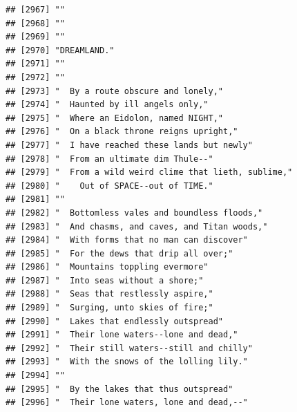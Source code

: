 \documentclass{article}\usepackage[]{graphicx}\usepackage[]{color}
\makeatletter
\newenvironment{kframe}{%
 \def\at@end@of@kframe{}%
 \ifinner\ifhmode%
  \def\at@end@of@kframe{\end{minipage}}%
  \begin{minipage}{\columnwidth}%
 \fi\fi%
 \def\FrameCommand##1{\hskip\@totalleftmargin \hskip-\fboxsep
 \colorbox{shadecolor}{##1}\hskip-\fboxsep
     \hskip-\linewidth \hskip-\@totalleftmargin \hskip\columnwidth}%
 \MakeFramed {\advance\hsize-\width
   \@totalleftmargin\z@ \linewidth\hsize
   \@setminipage}}%
 {\par\unskip\endMakeFramed%
 \at@end@of@kframe}
\newenvironment{knitrout}{}{} %
\makeatother
\begin{document}
\begin{knitrout}
\begin{kframe}
\begin{verbatim}
## [2967] ""                                                                            
## [2968] ""                                                                            
## [2969] ""                                                                            
## [2970] "DREAMLAND."                                                                  
## [2971] ""                                                                            
## [2972] ""                                                                            
## [2973] "  By a route obscure and lonely,"                                            
## [2974] "  Haunted by ill angels only,"                                               
## [2975] "  Where an Eidolon, named NIGHT,"                                            
## [2976] "  On a black throne reigns upright,"                                         
## [2977] "  I have reached these lands but newly"                                      
## [2978] "  From an ultimate dim Thule--"                                              
## [2979] "  From a wild weird clime that lieth, sublime,"                              
## [2980] "    Out of SPACE--out of TIME."                                              
## [2981] ""                                                                            
## [2982] "  Bottomless vales and boundless floods,"                                    
## [2983] "  And chasms, and caves, and Titan woods,"                                   
## [2984] "  With forms that no man can discover"                                       
## [2985] "  For the dews that drip all over;"                                          
## [2986] "  Mountains toppling evermore"                                               
## [2987] "  Into seas without a shore;"                                                
## [2988] "  Seas that restlessly aspire,"                                              
## [2989] "  Surging, unto skies of fire;"                                              
## [2990] "  Lakes that endlessly outspread"                                            
## [2991] "  Their lone waters--lone and dead,"                                         
## [2992] "  Their still waters--still and chilly"                                      
## [2993] "  With the snows of the lolling lily."                                       
## [2994] ""                                                                            
## [2995] "  By the lakes that thus outspread"                                          
## [2996] "  Their lone waters, lone and dead,--"                                       

\end{verbatim}
\end{kframe}
\end{knitrout}
\end{document}
